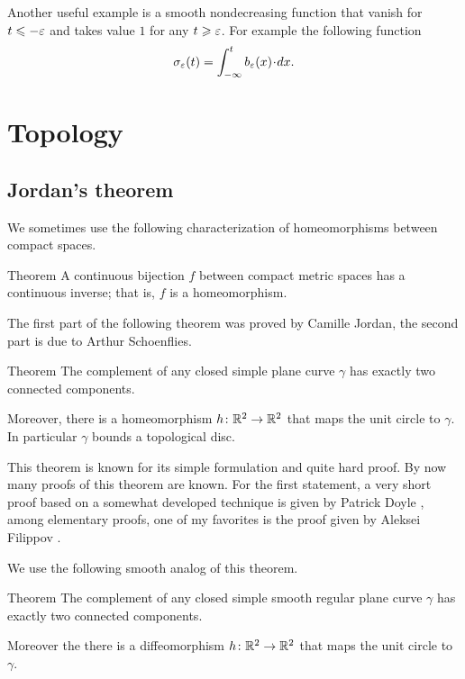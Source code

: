 Another useful example is a smooth nondecreasing function that vanish for $t\leqslant -\varepsilon$ and takes value $1$ for any $t\geqslant \varepsilon$.
For example the following function
\[\sigma_\eps(t)=\int_{-\infty}^t b_\eps(x)\cdot dx.\]


\chapter{Topology}

\section*{Jordan's theorem}

We sometimes use the following characterization of homeomorphisms between compact spaces.

\begin{thm}{Theorem}\label{thm:Hausdorff-compact}
A continuous bijection $f$ between compact metric spaces has a continuous inverse;
that is, $f$ is a homeomorphism.
\end{thm}


The first part of the following theorem was proved by Camille Jordan, the second part is due to Arthur Schoenflies.

\begin{thm}{Theorem}\label{thm:jordan}
The complement of any closed simple plane curve $\gamma$ has exactly two connected components. 

Moreover, there is a homeomorphism $h\colon\mathbb{R}^2\to \mathbb{R}^2$ that maps the unit circle to $\gamma$.
In particular $\gamma$ bounds a topological disc.
\end{thm}

This theorem is known for its simple formulation and quite hard proof.
By now many proofs of this theorem are known.
For the first statement, a very short proof based on a somewhat developed technique is given by Patrick Doyle \cite{doyle},
among elementary proofs, one of my favorites is the proof given by Aleksei Filippov \cite{filippov}.

We use the following smooth analog of this theorem.

\begin{thm}{Theorem}
The complement of any closed simple smooth regular plane curve $\gamma$ has exactly two connected components. 

Moreover the there is a diffeomorphism $h\colon\mathbb{R}^2\to \mathbb{R}^2$ that maps the unit circle to $\gamma$.
\end{thm}

